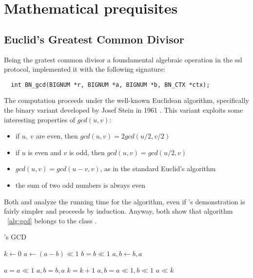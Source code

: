 \chapter{Mathematical prequisites \label{chap:preq}}

\section{Euclid's Greatest Common Divisor}

Being the gratest common divisor a foundamental algebraic operation in the ssl
protocol, \openssl implemented it with the following signature:

\begin{verbatim}
  int BN_gcd(BIGNUM *r, BIGNUM *a, BIGNUM *b, BN_CTX *ctx);
\end{verbatim}

The computation proceeds under the well-known Euclidean algorithm, specifically
the binary variant developed by Josef Stein in 1961 \cite{AOCPv2}. This variant
exploits some interesting properties of $gcd(u, v)$:

\begin{itemize}
  \setlength{\itemsep}{1pt}
  \setlength{\parskip}{0pt}
  \setlength{\parsep}{0pt}
\item if $u,\ v$ are even, then $gcd(u, v) = 2gcd(u/2, v/2)$
\item if $u$ is even and $v$ is odd, then $gcd(u, v) = gcd(u/2, v)$
\item  $gcd(u, v) = gcd(u-v, v)$, as in the standard Euclid's algorithm
\item the sum of two odd numbers is always even
\end{itemize}

Both \cite{AOCPv2} and \cite{MITalg} analyze the running time for the algorithm,
even if \cite{clrs}'s demonstration is fairly simpler and proceeds %
by induction.
Anyway, both show that algorithm ~\ref{alg:gcd} belongs to the class
.

\begin{algorithm}
  \caption{\openssl's GCD \label{alg:gcd}}
  \begin{algorithmic}[1]
    \State $k \gets 0$
          \State $a \gets (a-b) \ll 1$
        \Else
          \State $b = b \ll 1$
        \EndIf
         $a, b \gets b, a$ \EndIf

      \Else
          \State $a = a \ll 1$
           $a, b = b, a$ \EndIf
        \Else
          \State $k = k+1$
          \State $a, b = a \ll 1, b \ll 1$
        \EndIf
      \EndIf
    \EndWhile
    \State \Return $a \ll k$

  \end{algorithmic}
\end{algorithm}


